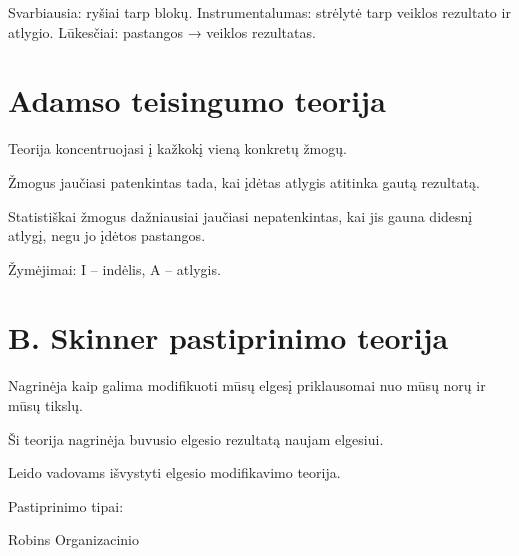 Svarbiausia: ryšiai tarp blokų. Instrumentalumas: strėlytė tarp veiklos
rezultato ir atlygio. Lūkesčiai: pastangos → veiklos rezultatas.

\section{Adamso teisingumo teorija}

Teorija koncentruojasi į kažkokį vieną konkretų žmogų.

Žmogus jaučiasi patenkintas tada, kai įdėtas atlygis atitinka gautą
rezultatą.

Statistiškai žmogus dažniausiai jaučiasi nepatenkintas, kai jis gauna
didesnį atlygį, negu jo įdėtos pastangos.

Žymėjimai: I – indėlis, A – atlygis.

\section{B. Skinner pastiprinimo teorija}

Nagrinėja kaip galima modifikuoti mūsų elgesį priklausomai nuo mūsų
norų ir mūsų tikslų.

Ši teorija nagrinėja buvusio elgesio rezultatą naujam elgesiui.

Leido vadovams išvystyti elgesio modifikavimo teorija.

Pastiprinimo tipai:


Robins Organizacinio 



